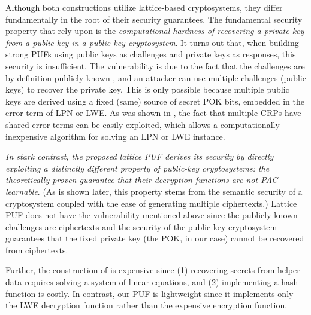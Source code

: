 Although both constructions utilize lattice-based cryptosystems, they differ fundamentally in the root of their security guarantees.
The fundamental security property that \cite{fuller2013computational} rely upon is the \emph{computational hardness of recovering a private key from a public key in a public-key cryptosystem}. 
It turns out that, when building strong PUFs using public keys as challenges and private keys as responses, this security is insufficient. 
The vulnerability is due to the fact that the challenges are by definition publicly known \cite{fuller2013computational,herder2017trapdoor,jin2017fpga}, and an attacker can use multiple challenges (public keys) to recover the private key. 
This is only possible because multiple public keys are derived using a fixed (same) source of secret POK bits, embedded in the error term of LPN or LWE. 
As was shown in \cite{apon2017efficient}, the fact that multiple CRPs have shared error terms can be easily exploited, which allows a computationally-inexpensive algorithm for solving an LPN or LWE instance. 

\emph{In stark contrast, the proposed lattice PUF derives its security by directly exploiting a distinctly different property of public-key cryptosystems: the theoretically-proven guarantee that their decryption functions are not PAC learnable}. 
(As is shown later, this property stems from the semantic security of a cryptosystem coupled with the ease of generating multiple ciphertexts.) 
Lattice PUF does not have the vulnerability mentioned above since the publicly known challenges are ciphertexts and the security of the public-key cryptosystem guarantees that the fixed private key (the POK, in our case) cannot be recovered from ciphertexts.

Further, the construction of  \cite{herder2017trapdoor,jin2017fpga} is expensive since (1) recovering secrets from helper data requires solving a system of linear equations, and (2) implementing a hash function is costly.  
In contrast, our PUF is lightweight since it implements only the LWE decryption function rather than the expensive encryption function.

